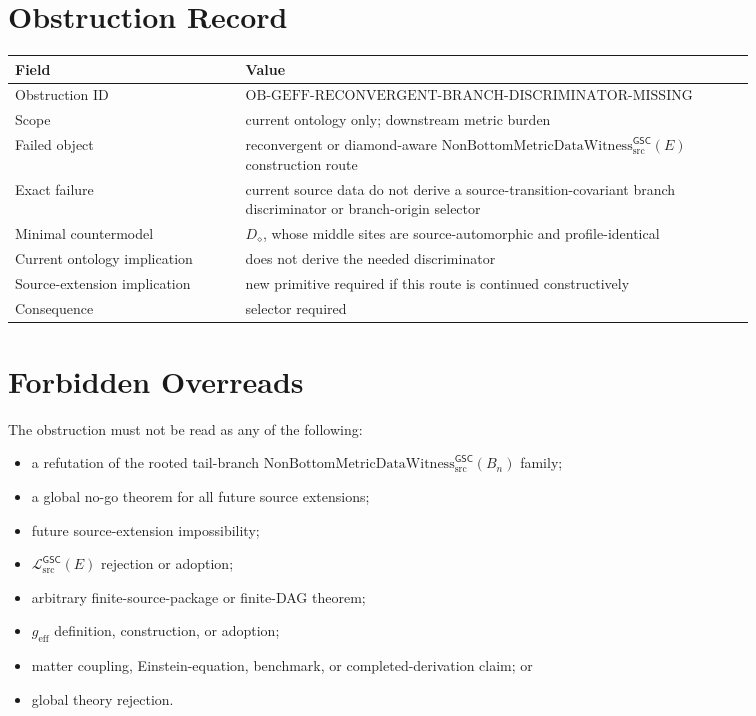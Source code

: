 \documentclass[11pt]{article}
\newcommand{\Witness}{\mathrm{NonBottomMetricDataWitness}_{\mathrm{src}}^{\mathsf{GSC}}}
\newcommand{\MetricData}{\mathcal{L}_{\mathrm{src}}^{\mathsf{GSC}}}
\newcommand{\geff}{g_{\mathrm{eff}}}
\newcommand{\Bn}{B_n}
\newcommand{\Diamond}{D_{\diamond}}
\begin{document}
\section{Obstruction Record}

\begin{longtable}{p{0.28\linewidth}p{0.58\linewidth}}
\toprule
Field & Value \\
\midrule
Obstruction ID &
\(\mathrm{OB\mbox{-}GEFF\mbox{-}RECONVERGENT\mbox{-}BRANCH\mbox{-}DISCRIMINATOR\mbox{-}MISSING}\) \\
Scope & current ontology only; downstream metric burden \\
Failed object & reconvergent or diamond-aware \(\Witness(E)\) construction route \\
Exact failure & current source data do not derive a source-transition-covariant branch discriminator or branch-origin selector \\
Minimal countermodel & \(\Diamond\), whose middle sites are source-automorphic and profile-identical \\
Current ontology implication & does not derive the needed discriminator \\
Source-extension implication & new primitive required if this route is continued constructively \\
Consequence & selector required \\
\bottomrule
\end{longtable}

\section{Forbidden Overreads}

The obstruction must not be read as any of the following:
\begin{itemize}[leftmargin=*]
  \item a refutation of the rooted tail-branch \(\Witness(\Bn)\) family;
  \item a global no-go theorem for all future source extensions;
  \item future source-extension impossibility;
  \item \(\MetricData(E)\) rejection or adoption;
  \item arbitrary finite-source-package or finite-DAG theorem;
  \item \(\geff\) definition, construction, or adoption;
  \item matter coupling, Einstein-equation, benchmark, or completed-derivation
  claim; or
  \item global theory rejection.
\end{itemize}
\end{document}
